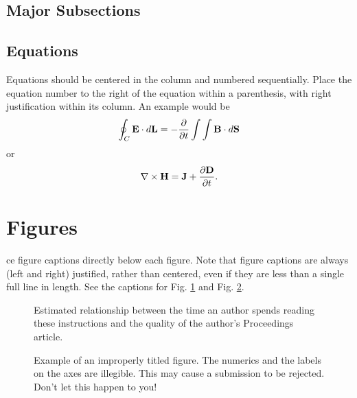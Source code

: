 \documentclass[10pt,conference,letterpaper]{RWWTemplate}
\begin{document}
\subsection{Major Subsections}




\subsection{Equations}
Equations should be centered in the column and numbered sequentially. Place the equation number to the right of the equation within a parenthesis, with right justification within its column. An example would be
\begin{equation}
  \oint_C {\bf E} \cdot d{\bf L} = - \frac{\partial}{\partial t} 
  \int\int {\bf B} \cdot d{\bf S}
  \label{eq1}
\end{equation}
or
\begin{equation}
  \nabla \times {\bf H} = {\bf J} + \frac{\partial{\bf D}}{\partial t}.
  \label{eq2}
\end{equation}



\section{Figures}

ce figure captions directly below each figure. Note that figure captions are always (left and right) justified, rather than centered, even if they are less than a single full line in length. See the captions for Fig. \ref{fig:sample_graph1} and Fig. \ref{fig:sample_graph2}.

\begin{figure}[htbp]
	\centerline{ }
	\caption{Estimated relationship between the time an author
	spends reading these instructions and the quality of the
	author's Proceedings article.}
	\label{fig:sample_graph1}
\end{figure}




\begin{figure}[htbp]
	\centerline{ }
	\caption{Example of an improperly titled figure. The numerics
	and the labels on the axes are illegible. This may cause a
	submission to be rejected. Don't let this happen to you!}
	\label{fig:sample_graph2}
\end{figure}
\end{document}
